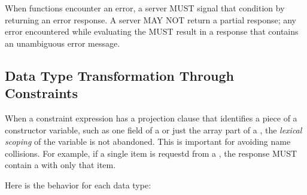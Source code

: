 \documentclass[justify]{nasa-ese}
\renewcommand{\new}[1]{\emph{#1}}
\begin{document}
When functions encounter an error, a \DAP server MUST signal that condition
by returning an error response. A server MAY NOT return a partial response;
any error encountered while evaluating the \CE MUST result in a response that
contains an unambiguous error message.

\subsection{Data Type Transformation Through Constraints}
\label{sec-ce-transform}

When a constraint expression has a projection clause that identifies a piece
of a constructor variable, such as one field of a \Structure or just the
array part of a \Grid, the \new{lexical scoping} of the variable is not
abandoned. This is important for avoiding name collisions. For example, if a
single item is requestd from a \Structure, the response MUST contain a
\Structure with only that item.

Here is the behavior for each data type:
\end{document}
